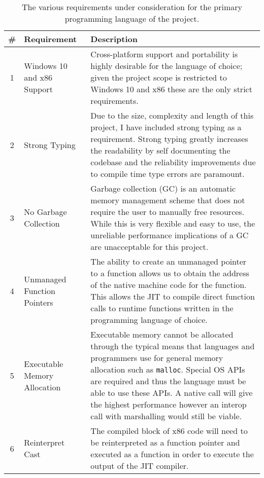 \begin{table}[h]
    \centering
    \begin{tabularx}{\linewidth}{c|l|X}
        \toprule
        \textbf{\#} & \textbf{Requirement} & \textbf{Description} \\
        \midrule
        1 & Windows 10 and x86 Support & Cross-platform support and portability is highly desirable for the language of choice; given the project scope is restricted to Windows 10 and x86 these are the only strict requirements. \\
        \midrule
        2 & Strong Typing & Due to the size, complexity and length of this project, I have included strong typing as a requirement. Strong typing greatly increases the readability by self documenting the codebase and the reliability improvements due to compile time type errors are paramount. \\
        \midrule
        3 & No Garbage Collection & Garbage collection (GC) is an automatic memory management scheme that does not require the user to manually free resources. While this is very flexible and easy to use, the unreliable performance implications of a GC are unacceptable for this project. \\
        \midrule
        4 & Unmanaged Function Pointers & The ability to create an unmanaged pointer to a function allows us to obtain the address of the native machine code for the function. This allows the JIT to compile direct function calls to runtime functions written in the programming language of choice. \\
        \midrule
        5 & Executable Memory Allocation & Executable memory cannot be allocated through the typical means that languages and programmers use for general memory allocation such as \texttt{malloc}. Special OS APIs are required and thus the language must be able to use these APIs. A native call will give the highest performance however an interop call with marshalling would still be viable. \\
        \midrule
        6 & Reinterpret Cast & The compiled block of x86 code will need to be reinterpreted as a function pointer and executed as a function in order to execute the output of the JIT compiler. \\
        \bottomrule
    \end{tabularx}
    \caption{The various requirements under consideration for the primary programming language of the project.}
    \label{list:req-features}
\end{table}

